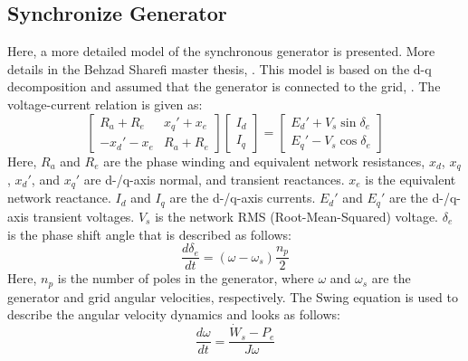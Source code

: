 \documentclass[%
]{USN-PhD}
\begin{document}
\subsection{Synchronize Generator}

Here, a more detailed model of the synchronous generator is presented. More details in the Behzad Sharefi master thesis, \cite{Sha:11}. This model is based on the d-q decomposition and assumed that the generator is connected to the grid, \cite{Sha:11}. The voltage-current relation is given as:
\begin{equation}
\left[\begin{matrix}R_a+R_e & x_q'+x_e\\ -x_d'-x_e & R_a+R_e\end{matrix}\right]\left[\begin{matrix}I_d \\ I_q\end{matrix}\right]= \left[\begin{matrix}E_d'+V_s\sin\delta_e \\ E_q'-V_s\cos\delta_e\end{matrix}\right]
\end{equation}
Here, $R_a$ and $R_e$ are the phase winding and equivalent network resistances, $x_d$, $x_q$, $x_d'$, and $x_q'$ are d-/q-axis normal, and transient reactances. $x_e$ is the equivalent network reactance. $I_d$ and $I_q$ are the d-/q-axis currents. $E_d'$ and $E_q'$ are the d-/q-axis transient voltages. $V_s$ is the network RMS (Root-Mean-Squared) voltage. $\delta_e$ is the phase shift angle that is described as follows:
\begin{equation}
\frac{d\delta_e}{dt} = (\omega - \omega_s)\frac{n_p}{2}
\end{equation}
Here, $n_p$ is the number of poles in the generator, where $\omega$ and $\omega_s$ are the generator and grid angular velocities, respectively. The Swing equation is used to describe the angular velocity dynamics and looks as follows:
\begin{equation}
\frac{d\omega}{dt}=\frac{\dot{W}_s-P_e}{J\omega}
\end{equation}
\end{document}
